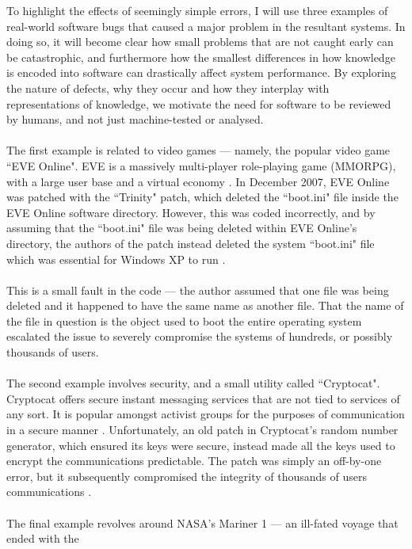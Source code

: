 To highlight the effects of seemingly simple errors, I will use three examples of real-world
software bugs that caused a major problem in the resultant systems.
In doing so, it will become clear how small problems that are not caught early can be catastrophic,
and furthermore how the smallest differences in how knowledge is encoded into software can
drastically affect system performance.
By exploring the nature of defects, why they occur and how they interplay with representations of
knowledge, we motivate the need for software to be reviewed by humans, and not just machine-tested
or analysed.\\
\\
The first example is related to video games --- namely, the popular video game ``EVE Online".
EVE is a massively multi-player role-playing game (MMORPG), with a large user base and a virtual
economy \cite{EVEWebsite}.
In December 2007, EVE Online was patched with the ``Trinity" patch, which deleted the ``boot.ini"
file inside the EVE Online software directory.
However, this was coded incorrectly, and by assuming that the ``boot.ini" file was being deleted
within EVE Online's directory, the authors of the patch instead deleted the system ``boot.ini" file
which was essential for Windows XP to run \cite{EVEUnboot}.\\
\\
This is a small fault in the code --- the author assumed that one file was being deleted and it
happened to have the same name as another file.
That the name of the file in question is the object used to boot the entire operating system
escalated the issue to severely compromise the systems of hundreds, or possibly thousands of
users.\\
\\
The second example involves security, and a small utility called ``Cryptocat".
Cryptocat offers secure instant messaging services that are not tied to services of any sort.
It is popular amongst activist groups for the purposes of communication in a secure manner
\cite{CryptocatWebsite}.
Unfortunately, an old patch in Cryptocat's random number generator, which ensured its keys were
secure, instead made all the keys used to encrypt the communications predictable.
The patch was simply an off-by-one error, but it subsequently compromised the integrity of thousands
of users communications \cite{CryptoShit}.\\
\\
The final example revolves around NASA's Mariner 1 --- an ill-fated voyage that ended with the
